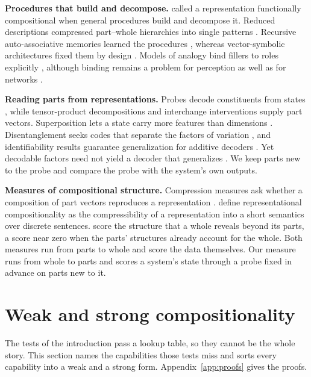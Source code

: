 \documentclass[10pt]{article}
\theoremstyle{plain}
\theoremstyle{remark}
\begin{document}
\textbf{Procedures that build and decompose.} \citet{vangelder1990} called a representation functionally compositional when general procedures build and decompose it. Reduced descriptions compressed part--whole hierarchies into single patterns \citep{hinton1990}. Recursive auto-associative memories learned the procedures \citep{pollack1990}, whereas vector-symbolic architectures fixed them by design \citep{plate1995,gayler2006,kanerva2009}. Models of analogy bind fillers to roles explicitly \citep{hummel1997}, although binding remains a problem for perception as well as for networks \citep{treisman1980,greff2020}.

\textbf{Reading parts from representations.} Probes decode constituents from states \citep{belinkov2022}, while tensor-product decompositions \citep{mccoy2019} and interchange interventions \citep{geiger2021} supply part vectors. Superposition lets a state carry more features than dimensions \citep{elhage2022}. Disentanglement seeks codes that separate the factors of variation \citep{bengio2013,locatello2019}, and identifiability results guarantee generalization for additive decoders \citep{lachapelle2023,wiedemer2024}. Yet decodable factors need not yield a decoder that generalizes \citep{montero2021}. We keep parts new to the probe and compare the probe with the system's own outputs.

\textbf{Measures of compositional structure.} Compression measures ask whether a composition of part vectors reproduces a representation \citep{andreas2019}. \citet{elmoznino2024} define representational compositionality as the compressibility of a representation into a short semantics over discrete sentences. \citet{elmoznino2026} score the structure that a whole reveals beyond its parts, a score near zero when the parts' structures already account for the whole. Both measures run from parts to whole and score the data themselves. Our measure runs from whole to parts and scores a system's state through a probe fixed in advance on parts new to it.

\section{Weak and strong compositionality}
\label{sec:definition}

The tests of the introduction pass a lookup table, so they cannot be the whole story. This section names the capabilities those tests miss and sorts every capability into a weak and a strong form. Appendix~\ref{app:proofs} gives the proofs.
\end{document}
